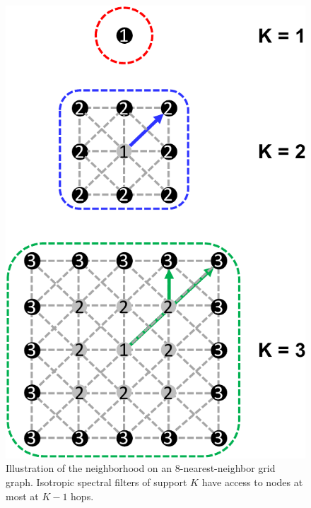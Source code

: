 \documentclass{article} %
\newcommand{\todo}[1]{{\color{red} #1 }}
\begin{document}
\begin{figure}[t]
\begin{minipage}[t]{0.37\linewidth}
		\includegraphics[width=\linewidth]{gcnn_grid}
		\caption{Illustration of the neighborhood on an 8-nearest-neighbor grid graph. Isotropic spectral filters of support $K$ have access to nodes at most at $K-1$ hops.}
		\label{fig:reach}
	\end{minipage}
\end{figure}


\end{document}
